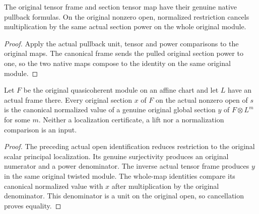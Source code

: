 \begin{lemma}
\label{lem:cech-line-section-original-native-pullback}
\leanok
The original tensor frame and section tensor map have their genuine native pullback formulas. On the original nonzero open, normalized restriction cancels multiplication by the same actual section power on the whole original module.
\end{lemma}
\begin{proof}
Apply the actual pullback unit, tensor and power comparisons to the original maps. The canonical frame sends the pulled original section power to one, so the two native maps compose to the identity on the same original module.
\end{proof}

\begin{lemma}
\label{lem:cech-line-section-original-affine-normalized-lift}
\leanok
Let $F$ be the original quasicoherent module on an affine chart and let $L$ have an actual frame there. Every original section $x$ of $F$ on the actual nonzero open of $s$ is the canonical normalized value of a genuine original global section $y$ of $F\otimes L^m$ for some $m$. Neither a localization certificate, a lift nor a normalization comparison is an input.
\end{lemma}
\begin{proof}
The preceding actual open identification reduces restriction to the original scalar principal localization. Its genuine surjectivity produces an original numerator and a power denominator. The inverse actual tensor frame produces $y$ in the same original twisted module. The whole-map identities compare its canonical normalized value with $x$ after multiplication by the original denominator. This denominator is a unit on the original open, so cancellation proves equality.
\end{proof}

